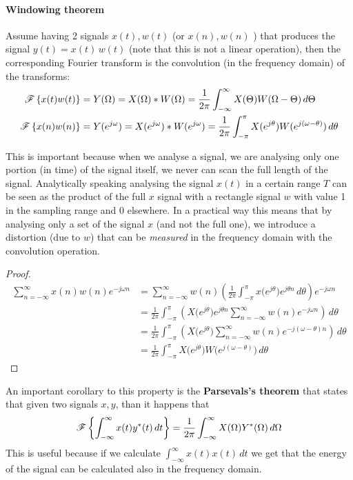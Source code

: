 		\paragraph{Windowing theorem} Assume having 2 signals $x(t),w(t)$ (or $x(n), w(n)$ ) that produces the signal $y(t) = x(t) \, w(t)$ (note that this is not a linear operation), then the corresponding Fourier transform is the convolution (in the frequency domain) of the transforms:
		\begin{equation} \label{eq:four:windowing}
		\begin{split}
			\mathscr{F}\left\{ x(t)w(t) \right\} & = Y(\Omega) = X(\Omega)*W(\Omega) = \frac 1 {2\pi} \int_{-\infty}^{\infty} X(\Theta) W(\Omega - \Theta)\, d\Theta \\
			\mathscr{F}\left\{ x(n)w(n) \right\} & =  Y(e^{j\omega}) = X(e^{j\omega}) * W(e^{j\omega}) = \frac 1 {2\pi} \int_{-\pi}^\pi X(e^{j\theta}) W(e^{j(\omega-\theta)}) \, d\theta
		\end{split}
		\end{equation}
		
		This is important because when we analyse a signal, we are analysing only one portion (in time) of the signal itself, we never can scan the full length of the signal. Analytically speaking analysing the signal $x(t)$ in a certain range $T$ can be seen as the product of the full $x$ signal with a rectangle signal $w$ with value 1 in the sampling range and 0 elsewhere. In a practical way this means that by analysing only a set of the signal $x$ (and not the full one), we introduce a distortion (due to $w$) that can be \textit{measured} in the frequency domain with the convolution operation.
		
		\begin{proof}
		\begin{align*}
			\sum_{n=-\infty}^\infty x(n) w(n) e^{-j\omega n} & = \sum_{n=-\infty}^\infty w(n) \left( \frac 1 {2\pi} \int_{-\pi}^\pi x\big(e^{j\theta}\big) e^{j\theta n} \, d\theta \right) e^{-j\omega n} \\
			& = \frac 1 {2\pi} \int_{-\pi}^\pi \left( X\big(e^{j\theta}\big) e^{j\theta n} \sum_{n=-\infty}^\infty w(n) e^{-j\omega n} \right) \, d\theta \\
			& = \frac 1 {2\pi} \int_{-\pi}^\pi \left( X\big(e^{j\theta}\big)  \sum_{n=-\infty}^\infty w(n) e^{-j(\omega-\theta) n} \right) \, d\theta \\
			& = \frac 1 {2\pi} \int_{-\pi}^\pi X\big(e^{j\theta}\big) W \big(e^{j(\omega - \theta)}\big) \, d\theta
		\end{align*}
		\end{proof}
		An important corollary to this property is the \textbf{Parsevals's theorem} that states that given two signals $x,y$, than it happens that
		\begin{equation}
			\mathscr{F}\left\{ \int_{-\infty}^\infty x(t) y^* (t)\, dt \right\} = \frac 1 {2\pi} \int_{-\infty} ^\infty X(\Omega) Y^*(\Omega)\, d\Omega
		\end{equation}
		This is useful because if we calculate $\int_{-\infty}^\infty x(t)x(t)\, dt$ we get that the energy of the signal can be calculated also in the frequency domain.
		
